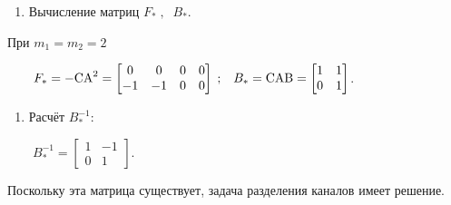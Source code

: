\documentclass[a4paper]{article}
\newcounter{saveenum}
\newcommand\liststyleWWviiiNumlxxvi{%
\renewcommand\theenumi{\arabic{enumi}}
\renewcommand\theenumii{\alph{enumii}}
\renewcommand\theenumiii{\roman{enumiii}}
\renewcommand\theenumiv{\arabic{enumiv}}
\renewcommand\labelenumi{\theenumi.}
\renewcommand\labelenumii{\theenumii.}
\renewcommand\labelenumiii{\theenumiii.}
\renewcommand\labelenumiv{\theenumiv.}
}
\newcommand\normalsubformula[1]{\text{\mathversion{normal}$#1$}}
\begin{document}
\liststyleWWviiiNumlxxvi
\setcounter{saveenum}{\value{enumi}}
\begin{enumerate}
\setcounter{enumi}{\value{saveenum}}
\item {\begin{russian}\sffamily
Вычисление матриц  $F_{\ast }\;,\;\;B_{\ast }$.
\end{russian}}
\end{enumerate}
{\begin{russian}\sffamily
При  $m_1=m_2=2$
\end{russian}}

{\begin{russian}\sffamily
\textenglish{\ \ }\ \  $F_{\ast
}=-\normalsubformula{\text{CA}}^2=\left[\begin{matrix}0&0&0&0\\-1&-1&0&0\end{matrix}\right]\;;\;\;\;B_{\ast
}=\normalsubformula{\text{CAB}}=\left[\begin{matrix}1&1\\0&1\end{matrix}\right]$.
\end{russian}}

\liststyleWWviiiNumlxxvi
\setcounter{saveenum}{\value{enumi}}
\begin{enumerate}
\setcounter{enumi}{\value{saveenum}}
\item {\begin{russian}\sffamily
Расчёт  $B_{\ast }^{-1}$:
\end{russian}}
\end{enumerate}
{\begin{russian}\sffamily
\textenglish{\ \ }\ \  $B_{\ast }^{-1}=\left[\begin{matrix}1&-1\\0&1\end{matrix}\right]$.
\end{russian}}

{\begin{russian}\sffamily
Поскольку эта матрица существует, задача разделения каналов имеет решение.
\end{russian}}
\end{document}
